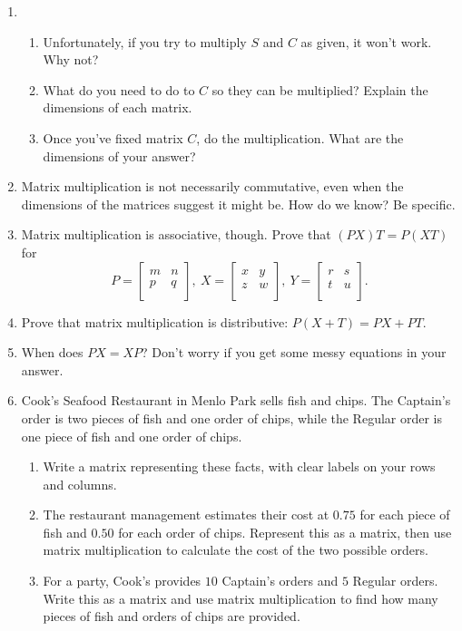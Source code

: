 \documentclass[../textbook.tex]{subfiles}
\begin{document}
\begin{enumerate}
\setcounter{enumi}{\value{problem_i}}
\item \begin{enumerate}
\item Unfortunately, if you try to multiply $S$ and $C$ as given, it won't work. Why not?
\item What do you need to do to $C$ so they can be multiplied? Explain the dimensions of each matrix.
\item Once you've fixed matrix $C$, do the multiplication. What are the dimensions of your answer?
\end{enumerate}
\item Matrix multiplication is not necessarily commutative, even when the dimensions of the matrices suggest it might be. How do we know? Be specific.
\item Matrix multiplication is associative, though. Prove that $(PX)T=P(XT)$ for $$P=\left[\begin{array}{cc} m & n \\ p & q \\ \end{array}\right],\: X=\left[\begin{array}{cc} x & y \\ z & w \\ \end{array}\right],\: Y=\left[\begin{array}{cc} r & s \\ t & u \\ \end{array}\right].$$
\item Prove that matrix multiplication is distributive: $P(X+T)=PX+PT$.
\item When does $PX=XP$? Don't worry if you get some messy equations in your answer.
\item Cook's Seafood Restaurant in Menlo Park sells fish and chips. The Captain's order is two pieces of fish and one order of chips, while the Regular order is one piece of fish and one order of chips.
\begin{enumerate}
\item Write a matrix representing these facts, with clear labels on your rows and columns.
\item The restaurant management estimates their cost at $0.75$ for each piece of fish and $0.50$ for each order of chips. Represent this as a matrix, then use matrix multiplication to calculate the cost of the two possible orders.
\item For a party, Cook's provides $10$ Captain's orders and $5$ Regular orders. Write this as a matrix and use matrix multiplication to find how many pieces of fish and orders of chips are provided.

\end{enumerate}
\end{enumerate}
\end{document}

